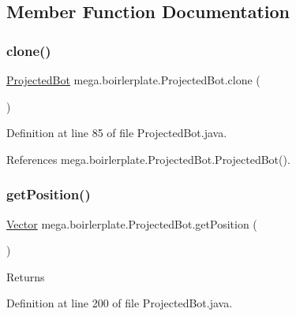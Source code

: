\subsection{Member Function Documentation}
\mbox{\label{classmega_1_1boirlerplate_1_1_projected_bot_a9a1bdfc9bb9c18555e5c38110a4dfae8}} 
\subsubsection{\texorpdfstring{clone()}{clone()}}
{\footnotesize\ttfamily \hyperlink{classmega_1_1boirlerplate_1_1_projected_bot}{Projected\+Bot} mega.\+boirlerplate.\+Projected\+Bot.\+clone (\begin{DoxyParamCaption}{ }\end{DoxyParamCaption})}



Definition at line 85 of file Projected\+Bot.\+java.



References mega.\+boirlerplate.\+Projected\+Bot.\+Projected\+Bot().

\mbox{\label{classmega_1_1boirlerplate_1_1_projected_bot_af4c577e26dc5cb14bd06ecff0ee8d708}} 
\subsubsection{\texorpdfstring{get\+Position()}{getPosition()}}
{\footnotesize\ttfamily \hyperlink{classmega_1_1boirlerplate_1_1_vector}{Vector} mega.\+boirlerplate.\+Projected\+Bot.\+get\+Position (\begin{DoxyParamCaption}{ }\end{DoxyParamCaption})}

\begin{DoxyReturn}{Returns}

\end{DoxyReturn}


Definition at line 200 of file Projected\+Bot.\+java.



